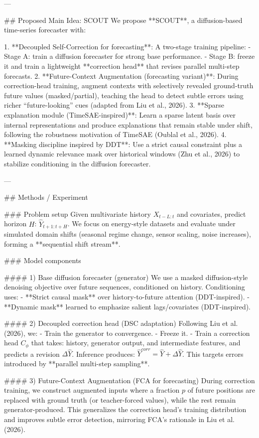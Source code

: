 ---

## Proposed Main Idea: SCOUT  
We propose **SCOUT**, a diffusion-based time-series forecaster with:

1. **Decoupled Self-Correction for forecasting**: A two-stage training pipeline:
   - Stage A: train a diffusion forecaster for strong base performance.
   - Stage B: freeze it and train a lightweight **correction head** that revises parallel multi-step forecasts.
2. **Future-Context Augmentation (forecasting variant)**: During correction-head training, augment contexts with selectively revealed ground-truth future values (masked/partial), teaching the head to detect subtle errors using richer “future-looking” cues (adapted from Liu et al., 2026).
3. **Sparse explanation module (TimeSAE-inspired)**: Learn a sparse latent basis over internal representations and produce explanations that remain stable under shift, following the robustness motivation of TimeSAE (Oublal et al., 2026).
4. **Masking discipline inspired by DDT**: Use a strict causal constraint plus a learned dynamic relevance mask over historical windows (Zhu et al., 2026) to stabilize conditioning in the diffusion forecaster.

---

## Methods / Experiment  

### Problem setup  
Given multivariate history \(X_{t-L:t}\) and covariates, predict horizon \(H\): \(\hat{Y}_{t+1:t+H}\). We focus on energy-style datasets and evaluate under simulated domain shifts (seasonal regime change, sensor scaling, noise increases), forming a **sequential shift stream**.

### Model components  

#### 1) Base diffusion forecaster (generator)  
We use a masked diffusion-style denoising objective over future sequences, conditioned on history. Conditioning uses:
- **Strict causal mask** over history-to-future attention (DDT-inspired).
- **Dynamic mask** learned to emphasize salient lags/covariates (DDT-inspired).

#### 2) Decoupled correction head (DSC adaptation)  
Following Liu et al. (2026), we:
- Train the generator to convergence.
- Freeze it.
- Train a correction head \(C_\phi\) that takes: history, generator output, and intermediate features, and predicts a revision \(\Delta\hat{Y}\).  
Inference produces: \(\hat{Y}^{corr} = \hat{Y} + \Delta\hat{Y}\).  
This targets errors introduced by **parallel multi-step sampling**.

#### 3) Future-Context Augmentation (FCA for forecasting)  
During correction training, we construct augmented inputs where a fraction \(p\) of future positions are replaced with ground truth (or teacher-forced values), while the rest remain generator-produced. This generalizes the correction head’s training distribution and improves subtle error detection, mirroring FCA’s rationale in Liu et al. (2026).


